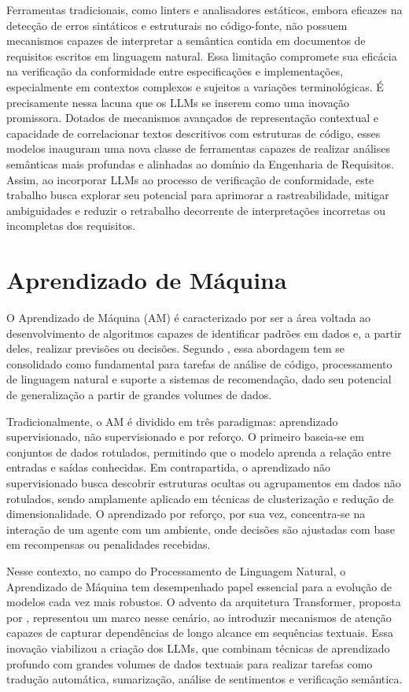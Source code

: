 Ferramentas tradicionais, como linters e analisadores estáticos, embora eficazes na detecção de erros sintáticos e estruturais no código-fonte, não possuem mecanismos capazes de interpretar a semântica contida em documentos de requisitos escritos em linguagem natural. Essa limitação compromete sua eficácia na verificação da conformidade entre especificações e implementações, especialmente em contextos complexos e sujeitos a variações terminológicas. É precisamente nessa lacuna que os LLMs se inserem como uma inovação promissora. Dotados de mecanismos avançados de representação contextual e capacidade de correlacionar textos descritivos com estruturas de código, esses modelos inauguram uma nova classe de ferramentas capazes de realizar análises semânticas mais profundas e alinhadas ao domínio da Engenharia de Requisitos. Assim, ao incorporar LLMs ao processo de verificação de conformidade, este trabalho busca explorar seu potencial para aprimorar a rastreabilidade, mitigar ambiguidades e reduzir o retrabalho decorrente de interpretações incorretas ou incompletas dos requisitos.


\section{Aprendizado de Máquina}

O Aprendizado de Máquina (AM) é caracterizado por ser a área voltada ao desenvolvimento de algoritmos capazes de identificar padrões em dados e, a partir deles, realizar previsões ou decisões. Segundo , essa abordagem tem se consolidado como fundamental para tarefas de análise de código, processamento de linguagem natural e suporte a sistemas de recomendação, dado seu potencial de generalização a partir de grandes volumes de dados.

Tradicionalmente, o AM é dividido em três paradigmas: aprendizado supervisionado, não supervisionado e por reforço. O primeiro baseia-se em conjuntos de dados rotulados, permitindo que o modelo aprenda a relação entre entradas e saídas conhecidas. Em contrapartida, o aprendizado não supervisionado busca descobrir estruturas ocultas ou agrupamentos em dados não rotulados, sendo amplamente aplicado em técnicas de clusterização e redução de dimensionalidade. O aprendizado por reforço, por sua vez, concentra-se na interação de um agente com um ambiente, onde decisões são ajustadas com base em recompensas ou penalidades recebidas.

Nesse contexto, no campo do Processamento de Linguagem Natural, o Aprendizado de Máquina tem desempenhado papel essencial para a evolução de modelos cada vez mais robustos. O advento da arquitetura Transformer, proposta por , representou um marco nesse cenário, ao introduzir mecanismos de atenção capazes de capturar dependências de longo alcance em sequências textuais. Essa inovação viabilizou a criação dos LLMs, que combinam técnicas de aprendizado profundo com grandes volumes de dados textuais para realizar tarefas como tradução automática, sumarização, análise de sentimentos e verificação semântica.

